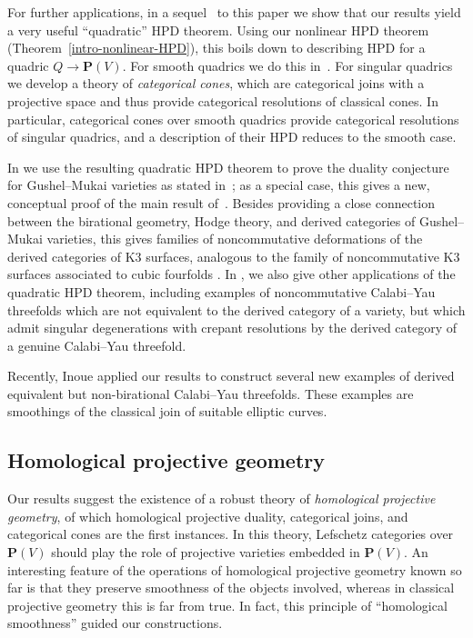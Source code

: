 \documentclass[11pt, reqno]{amsart}
\numberwithin{equation}{section}
\theoremstyle{plain}
\theoremstyle{definition}
\newcommand{\bP}{\mathbf{P}}
\begin{document}
For further applications, in a sequel~\cite{categorical-cones} to this paper 
we show that our results yield a very useful ``quadratic'' HPD theorem. 
Using our nonlinear HPD theorem (Theorem~\ref{intro-nonlinear-HPD}), this boils 
down to describing HPD for a quadric $Q \to \bP(V)$. 
For smooth quadrics we do this in~\cite{kuznetsov-perry-HPD-quadrics}. 
For singular quadrics we develop a theory of \emph{categorical cones},
which are categorical joins with a projective space and thus provide categorical resolutions of classical cones.
In particular, categorical cones over smooth quadrics provide categorical resolutions of singular quadrics, 
and a description of their HPD reduces to the smooth case. 

In \cite{categorical-cones} we use the resulting quadratic HPD theorem to prove  
the duality conjecture for Gushel--Mukai varieties as stated in~\cite{kuznetsov2016perry}; 
as a special case, this gives a new, conceptual proof of the main result of~\cite{kuznetsov2016perry}. 
Besides providing a close connection between the birational geometry, Hodge theory, and 
derived categories of Gushel--Mukai varieties, this gives families of noncommutative 
deformations of the derived categories of K3 surfaces, analogous to the family of 
noncommutative K3 surfaces associated to cubic fourfolds \cite{kuznetsov2010derived}. 
In \cite{categorical-cones}, we also give other applications of the quadratic HPD theorem, 
including examples of noncommutative Calabi--Yau threefolds which are not equivalent to the derived 
category of a variety, but which admit singular degenerations with crepant resolutions by 
the derived category of a genuine Calabi--Yau threefold. 

Recently, Inoue \cite{inoue} applied our results to construct several new examples of derived equivalent 
but non-birational Calabi--Yau threefolds. 
These examples are smoothings of the classical join of suitable elliptic curves. 

\subsection{Homological projective geometry} 
\label{section-homological-projective-geometry} 

Our results suggest the existence of a robust theory of \emph{homological projective geometry}, 
of which homological projective duality, categorical joins, and categorical cones 
are the first instances. 
In this theory, Lefschetz categories over~$\bP(V)$ should play the role of 
projective varieties embedded in $\bP(V)$. 
An interesting feature of the operations of homological projective geometry known so far
is that they preserve smoothness of the objects involved, 
whereas in classical projective geometry this is far from true. 
In fact, this principle of ``homological smoothness'' guided our constructions.
\end{document}
